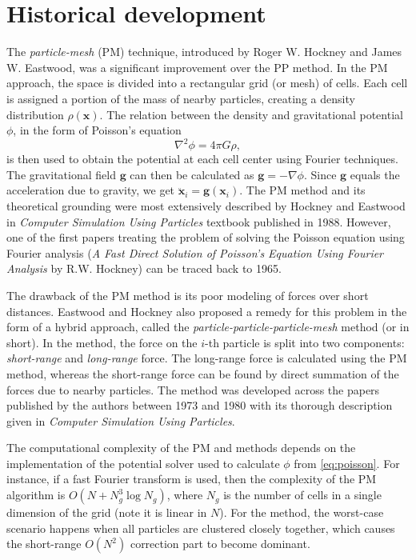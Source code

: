 \section{Historical development}\label{sec:historical-development}
The \textit{particle-mesh} (PM) technique, introduced by Roger W. Hockney and James W. Eastwood, was a significant improvement over the PP method.
In the PM approach, the space is divided into a rectangular grid (or mesh) of cells.
Each cell is assigned a portion of the mass of nearby particles, creating a density distribution $\rho(\mathbf{x})$.
The relation between the density and gravitational potential $\phi$, in the form of Poisson's equation
\begin{equation}\label{eq:poisson}
    \nabla^2\phi = 4\pi G \rho,
\end{equation}
is then used to obtain the potential at each cell center using Fourier techniques.
The gravitational field $\mathbf{g}$ can then be calculated as $\mathbf{g} = -\nabla \phi$.
Since $\mathbf{g}$ equals the acceleration due to gravity, we get $\ddot{\mathbf{x}}_i = \mathbf{g}(\mathbf{x}_i)$.
The PM method and its theoretical grounding were most extensively described by Hockney and Eastwood in \textit{Computer Simulation Using Particles} textbook published in 1988.
However, one of the first papers treating the problem of solving the Poisson equation using Fourier analysis (\textit{A Fast Direct Solution of Poisson's Equation Using Fourier Analysis} by R.W. Hockney) can be traced back to 1965.

The drawback of the PM method is its poor modeling of forces over short distances.
Eastwood and Hockney also proposed a remedy for this problem in the form of a hybrid approach, called the \textit{particle-particle-particle-mesh} method (or \PThreeM{} in short).
In the \PThreeM{} method, the force on the $i$-th particle is split into two components: \textit{short-range} and \textit{long-range} force.
The long-range force is calculated using the PM method, whereas the short-range force can be found by direct summation of the forces due to nearby particles.
The \PThreeM{} method was developed across the papers published by the authors between 1973 and 1980 with its thorough description given in \textit{Computer Simulation Using Particles}.

The computational complexity of the PM and \PThreeM{} methods depends on the implementation of the potential solver used to calculate $\phi$ from \autoref{eq:poisson}.
For instance, if a fast Fourier transform is used, then the complexity of the PM algorithm is $O(N + N_g^3\log N_g)$, where $N_g$ is the number of cells in a single dimension of the grid (note it is linear in $N$).
For the \PThreeM{} method, the worst-case scenario happens when all particles are clustered closely together, which causes the short-range $O(N^2)$ correction part to become dominant.

